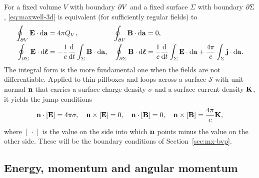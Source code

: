 For a fixed volume $V$ with boundary $\partial V$ and a fixed surface $\Sigma$
with boundary $\partial\Sigma$, \eqref{eq:maxwell-3d} is equivalent (for
sufficiently regular fields) to
\begin{align}
\oint_{\partial V}\mathbf{E}\cdot\mathrm{d}\mathbf a&=4\pi Q_V,&
\oint_{\partial V}\mathbf{B}\cdot\mathrm{d}\mathbf a&=0,\\
\oint_{\partial\Sigma}\mathbf{E}\cdot\mathrm{d}\boldsymbol\ell&=-\frac1c\frac{\mathrm{d}}{\mathrm{d} t}\int_\Sigma\mathbf{B}\cdot\mathrm{d}\mathbf a,&
\oint_{\partial\Sigma}\mathbf{B}\cdot\mathrm{d}\boldsymbol\ell&=\frac1c\frac{\mathrm{d}}{\mathrm{d} t}\int_\Sigma\mathbf{E}\cdot\mathrm{d}\mathbf a+\frac{4\pi}{c}\int_\Sigma\mathbf{j}\cdot\mathrm{d}\mathbf a .
\end{align}
The integral form is the more fundamental one when the fields are not
differentiable.  Applied to thin pillboxes and loops across a surface
$\mathcal S$ with unit normal $\mathbf{n}$ that carries a surface charge density
$\sigma$ and a surface current density $\mathbf{K}$, it yields the jump
conditions
\begin{equation}\label{eq:jump}
\mathbf{n}\cdot[\mathbf{E}]=4\pi\sigma,\quad
\mathbf{n}\times[\mathbf{E}]=0,\quad
\mathbf{n}\cdot[\mathbf{B}]=0,\quad
\mathbf{n}\times[\mathbf{B}]=\frac{4\pi}{c}\mathbf{K} ,
\end{equation}
where $[\,\cdot\,]$ is the value on the side into which $\mathbf{n}$ points minus
the value on the other side.  These will be the boundary conditions of
Section~\ref{sec:mx-bvp}.

\subsection{Energy, momentum and angular momentum}


